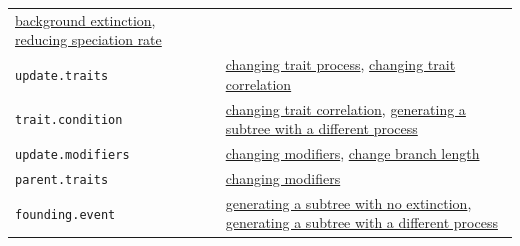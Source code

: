 \documentclass[
]{book}
\begin{document}
\begin{longtable}[]{@{}ll@{}}
\begin{minipage}[t]{0.39\columnwidth}
\protect\hyperlink{EGbg_ext}{background extinction}, \protect\hyperlink{EGred_spec}{reducing speciation rate}\strut
\end{minipage}\tabularnewline
\begin{minipage}[t]{0.55\columnwidth}\raggedright
\texttt{update.traits}\strut
\end{minipage} & \begin{minipage}[t]{0.39\columnwidth}\raggedright
\protect\hyperlink{EG_change_trait}{changing trait process}, \protect\hyperlink{EG_change_correlation}{changing trait correlation}\strut
\end{minipage}\tabularnewline
\begin{minipage}[t]{0.55\columnwidth}\raggedright
\texttt{trait.condition}\strut
\end{minipage} & \begin{minipage}[t]{0.39\columnwidth}\raggedright
\protect\hyperlink{EG_change_correlation}{changing trait correlation}, \href{EG_founding_traits}{generating a subtree with a different process}\strut
\end{minipage}\tabularnewline
\begin{minipage}[t]{0.55\columnwidth}\raggedright
\texttt{update.modifiers}\strut
\end{minipage} & \begin{minipage}[t]{0.39\columnwidth}\raggedright
\protect\hyperlink{EG_change_modif}{changing modifiers}, \protect\hyperlink{EG_modify_brlen}{change branch length}\strut
\end{minipage}\tabularnewline
\begin{minipage}[t]{0.55\columnwidth}\raggedright
\texttt{parent.traits}\strut
\end{minipage} & \begin{minipage}[t]{0.39\columnwidth}\raggedright
\protect\hyperlink{EG_change_modif}{changing modifiers}\strut
\end{minipage}\tabularnewline
\begin{minipage}[t]{0.55\columnwidth}\raggedright
\texttt{founding.event}\strut
\end{minipage} & \begin{minipage}[t]{0.39\columnwidth}\raggedright
\protect\hyperlink{EG_founding_purebirth}{generating a subtree with no extinction}, \href{EG_founding_traits}{generating a subtree with a different process}\strut
\end{minipage}\tabularnewline
\bottomrule
\end{longtable}
\end{document}
